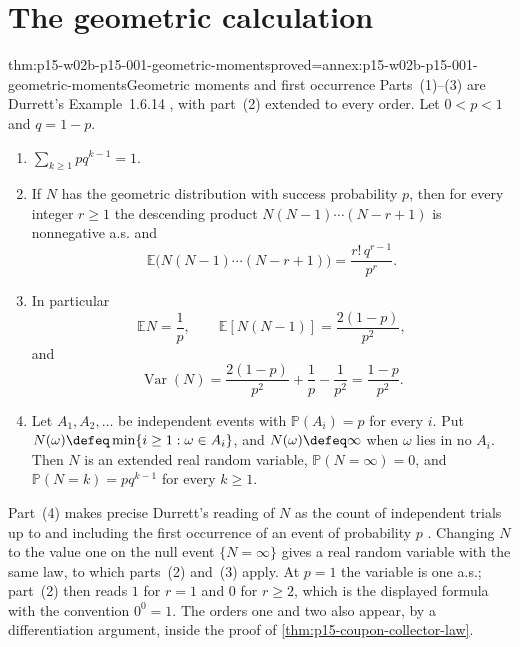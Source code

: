 \section{The geometric calculation}
\label{sec:p15-w02b-p15-001-geometric}

\begin{hbtheorem}{thm:p15-w02b-p15-001-geometric-moments}{proved=annex:p15-w02b-p15-001-geometric-moments}{Geometric moments and first occurrence}
Parts~(1)--(3) are Durrett's Example~1.6.14
\cite[p.~35]{DurrettPTEAuthor2019}, with part~(2) extended to every order.
Let \(0<p<1\) and \(q=1-p\).
\begin{enumerate}
\item \(\sum_{k\geq1}pq^{k-1}=1\).
\item If \(N\) has the geometric distribution with success probability
      \(p\), then for every integer \(r\geq1\) the descending product
      \(N(N-1)\cdots(N-r+1)\) is nonnegative a.s. and
      \[
       \mathbb E\bigl(N(N-1)\cdots(N-r+1)\bigr)
        =\frac{r!\,q^{r-1}}{p^r}.
      \]
\item In particular
      \[
       \mathbb EN=\frac1p,\qquad
       \mathbb E[N(N-1)]=\frac{2(1-p)}{p^2},
      \]
      and
      \[
       \operatorname{Var}(N)=\frac{2(1-p)}{p^2}+\frac1p-\frac1{p^2}
        =\frac{1-p}{p^2}.
      \]
\item Let \(A_1,A_2,\ldots\) be independent events with
      \(\mathbb P(A_i)=p\) for every \(i\). Put
      \(N(\omega)\defeq\min\{i\geq1:\omega\in A_i\}\), and
      \(N(\omega)\defeq\infty\) when \(\omega\) lies in no \(A_i\).
      Then \(N\) is an extended real random variable,
      \(\mathbb P(N=\infty)=0\), and
      \(\mathbb P(N=k)=pq^{k-1}\) for every \(k\geq1\).
\end{enumerate}
\end{hbtheorem}

Part~(4) makes precise Durrett's reading of \(N\) as the count of
independent trials up to and including the first occurrence of an event
of probability \(p\)
\cite[p.~35]{DurrettPTEAuthor2019}. Changing \(N\) to the value one on
the null event \(\{N=\infty\}\) gives a real random variable with the
same law, to which parts~(2) and~(3) apply. At \(p=1\) the variable is
one a.s.; part~(2) then reads \(1\) for \(r=1\) and \(0\) for
\(r\geq2\), which is the displayed formula with the convention
\(0^0=1\). The orders one and two also appear, by a differentiation
argument, inside the proof of \cref{thm:p15-coupon-collector-law}.

